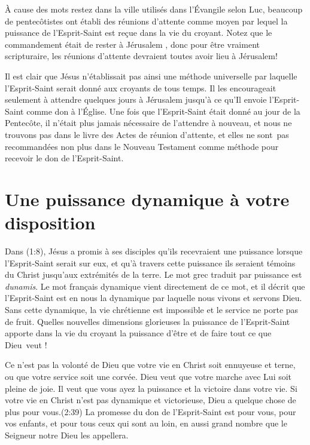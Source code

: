 À cause des mots \Og restez dans la ville \Fg{} utilisés dans
 l'Évangile
 selon Luc, beaucoup de pentecôtistes ont établi des \Og réunions
 d'attente \Fg{} comme moyen par lequel la puissance de l'Esprit-Saint est
 reçue dans la vie du croyant. Notez que le commandement était de \Og rester
 à Jérusalem  \Fg{},
 donc pour être vraiment scripturaire, les réunions d'attente devraient toutes
 avoir lieu à Jérusalem!

Il est clair que Jésus n'établissait pas ainsi une méthode universelle par
 laquelle l'Esprit-Saint serait donné aux croyants de tous temps. Il les
 encourageait seulement à attendre quelques jours à Jérusalem jusqu'à ce
 qu'Il envoie l'Esprit-Saint comme don à l'Église. Une fois que
 l'Esprit-Saint était donné au jour de la Pentecôte, il n'était plus
 jamais nécessaire de l'attendre à nouveau, et nous ne trouvons pas dans
 le livre des Actes de réunion d'attente, et elles ne sont~pas recommandées
 non plus dans le Nouveau Testament comme méthode pour recevoir le don de
 l'Esprit-Saint.


\section{Une puissance dynamique à votre disposition}

Dans (1:8), Jésus a promis à ses disciples
 qu'ils recevraient une puissance lorsque l'Esprit-Saint serait
 sur eux, et qu'à travers cette puissance ils seraient témoins
 du Christ jusqu'aux extrémités de la terre.
 Le mot grec traduit par \Og puissance \Fg{} est \emph{dunamis}.
 Le mot français \Og dynamique \Fg{} vient directement de ce mot,
 et il décrit que l'Esprit-Saint est en nous \ocadr la dynamique par laquelle
 nous vivons et servons Dieu. Sans cette dynamique, la vie chrétienne est
 impossible et le service ne porte pas de fruit.
 Quelles nouvelles dimensions glorieuses la puissance de l'Esprit-Saint
 apporte dans la vie du croyant \ocadr la puissance d'être et de faire
 tout ce que Dieu~veut !

Ce n'est pas la volonté de Dieu que votre vie en Christ soit ennuyeuse
 et terne, ou que votre service soit une corvée.
 Dieu veut que votre marche avec Lui soit pleine de joie.
 Il veut que vous ayez la puissance et la victoire dans votre vie.
 Si votre vie en Christ n'est pas dynamique et victorieuse,
 Dieu a quelque chose de plus pour vous.(2:39)
 La promesse du don de l'Esprit-Saint est \Og pour vous, pour vos enfants,
 et pour tous ceux qui sont au loin,
 en aussi grand nombre que le Seigneur notre Dieu les appellera. \Fg{}
\closechapter


